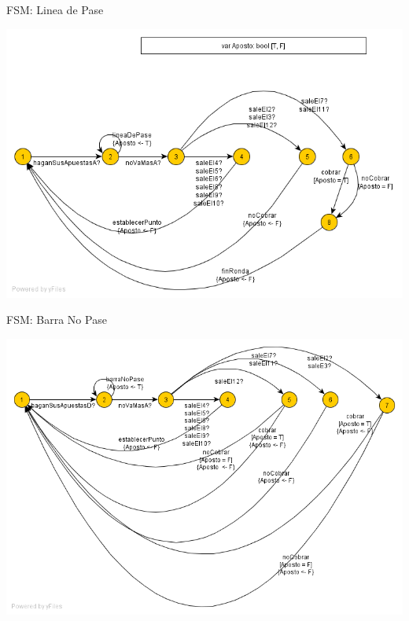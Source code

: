 {\large FSM: Linea de Pase}
\begin{center}
\includegraphics[scale=0.5]{img/linesDePase.png}
\end{center}

{\large FSM: Barra No Pase}
\begin{center}
\includegraphics[scale=0.5]{img/barraNoPase.png}
\end{center}

